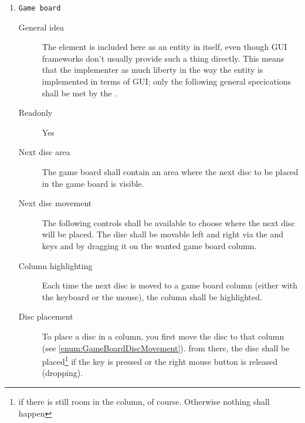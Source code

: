 \begin{enumerate}
    \item \texttt{Game board}
              \begin{description}
                  \item[General idea] The  element is included here
                                      as an entity in itself, even though GUI frameworks
                                      don't usually provide such a thing directly. This
                                      means that the implementer as much liberty in the
                                      way the  entity is implemented in
                                      terms of GUI; only the following general specications
                                      shall be met by the .
                  \item[Readonly] Yes
                  \item[Next disc area] The game board shall contain an area where the next
                                        disc to be placed in the game board is visible.
                  \item[Next disc movement] \label{enum:GameBoardDiscMovement} The following
                                            controls shall be available to choose where the
                                            next disc will be placed. The disc shall be
                                            movable left and right via the \LArrow and
                                            \RArrow keys and by dragging it on the wanted
                                            game board column.
                  \item[Column highlighting] Each time the next disc is moved to a game board
                                             column (either with the keyboard or the mouse),
                                             the column shall be highlighted.
                  \item[Disc placement] To place a disc in a column, you first move the disc
                                        to that column (see \cref{enum:GameBoardDiscMovement}).
                                        from there, the disc shall be placed\footnote{if
                                        there is still room in the column, of course. Otherwise
                                        nothing shall happen} if the \DArrow key is pressed or
                                        the right mouse button is released (dropping).
              \end{description}



\end{enumerate}
